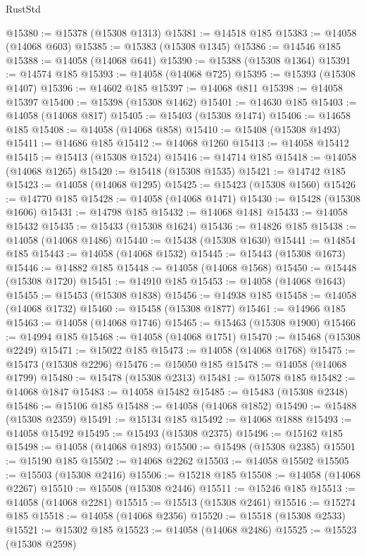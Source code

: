 \begin{lexlean}{RustStd}
\begin{coremodule}
@15380 := @15378 (@15308 @1313)
@15381 := @14518 @185
@15383 := @14058 (@14068 @603)
@15385 := @15383 (@15308 @1345)
@15386 := @14546 @185
@15388 := @14058 (@14068 @641)
@15390 := @15388 (@15308 @1364)
@15391 := @14574 @185
@15393 := @14058 (@14068 @725)
@15395 := @15393 (@15308 @1407)
@15396 := @14602 @185
@15397 := @14068 @811
@15398 := @14058 @15397
@15400 := @15398 (@15308 @1462)
@15401 := @14630 @185
@15403 := @14058 (@14068 @817)
@15405 := @15403 (@15308 @1474)
@15406 := @14658 @185
@15408 := @14058 (@14068 @858)
@15410 := @15408 (@15308 @1493)
@15411 := @14686 @185
@15412 := @14068 @1260
@15413 := @14058 @15412
@15415 := @15413 (@15308 @1524)
@15416 := @14714 @185
@15418 := @14058 (@14068 @1265)
@15420 := @15418 (@15308 @1535)
@15421 := @14742 @185
@15423 := @14058 (@14068 @1295)
@15425 := @15423 (@15308 @1560)
@15426 := @14770 @185
@15428 := @14058 (@14068 @1471)
@15430 := @15428 (@15308 @1606)
@15431 := @14798 @185
@15432 := @14068 @1481
@15433 := @14058 @15432
@15435 := @15433 (@15308 @1624)
@15436 := @14826 @185
@15438 := @14058 (@14068 @1486)
@15440 := @15438 (@15308 @1630)
@15441 := @14854 @185
@15443 := @14058 (@14068 @1532)
@15445 := @15443 (@15308 @1673)
@15446 := @14882 @185
@15448 := @14058 (@14068 @1568)
@15450 := @15448 (@15308 @1720)
@15451 := @14910 @185
@15453 := @14058 (@14068 @1643)
@15455 := @15453 (@15308 @1838)
@15456 := @14938 @185
@15458 := @14058 (@14068 @1732)
@15460 := @15458 (@15308 @1877)
@15461 := @14966 @185
@15463 := @14058 (@14068 @1746)
@15465 := @15463 (@15308 @1900)
@15466 := @14994 @185
@15468 := @14058 (@14068 @1751)
@15470 := @15468 (@15308 @2249)
@15471 := @15022 @185
@15473 := @14058 (@14068 @1768)
@15475 := @15473 (@15308 @2296)
@15476 := @15050 @185
@15478 := @14058 (@14068 @1799)
@15480 := @15478 (@15308 @2313)
@15481 := @15078 @185
@15482 := @14068 @1847
@15483 := @14058 @15482
@15485 := @15483 (@15308 @2348)
@15486 := @15106 @185
@15488 := @14058 (@14068 @1852)
@15490 := @15488 (@15308 @2359)
@15491 := @15134 @185
@15492 := @14068 @1888
@15493 := @14058 @15492
@15495 := @15493 (@15308 @2375)
@15496 := @15162 @185
@15498 := @14058 (@14068 @1893)
@15500 := @15498 (@15308 @2385)
@15501 := @15190 @185
@15502 := @14068 @2262
@15503 := @14058 @15502
@15505 := @15503 (@15308 @2416)
@15506 := @15218 @185
@15508 := @14058 (@14068 @2267)
@15510 := @15508 (@15308 @2446)
@15511 := @15246 @185
@15513 := @14058 (@14068 @2281)
@15515 := @15513 (@15308 @2461)
@15516 := @15274 @185
@15518 := @14058 (@14068 @2356)
@15520 := @15518 (@15308 @2533)
@15521 := @15302 @185
@15523 := @14058 (@14068 @2486)
@15525 := @15523 (@15308 @2598)

\end{coremodule}
\end{lexlean}
